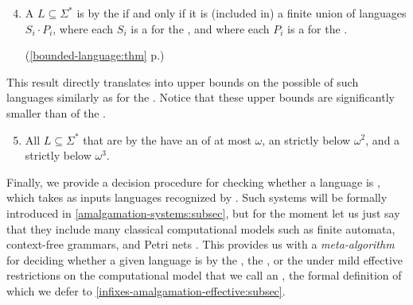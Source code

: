 {
\renewcommand{\labelenumi}{R\arabic{enumi}}
\begin{enumerate}
	\setcounter{enumi}{3}
    \item A  $L \subseteq \Sigma^*$ is  by the  if and only if it is (included in) a finite union of languages $S_i \cdot P_i$, where each $S_i$ 
        is a  for the ,
        and where
        each $P_i$ is a  for the .

        \hfill
        (\cref{bounded-language:thm} p.\pageref{bounded-language:thm})
\end{enumerate}
}

This result directly translates into upper bounds on the possible 
of such languages similarly as for the . Notice that these
upper bounds are significantly smaller than  of the .
{
\renewcommand{\labelenumi}{R\arabic{enumi}}
\begin{enumerate}
    \setcounter{enumi}{4}
    \item All 
            $L \subseteq \Sigma^*$ that are  by the 
            have an  of at most $\omega$,
            an  strictly below $\omega^2$, and
            a  strictly below $\omega^3$.
\end{enumerate}
}

\AP Finally, we provide a decision procedure for checking whether a language is
, which takes as inputs languages recognized by
 \cite{ASZZ24}. Such systems will be formally
introduced in
\cref{amalgamation-systems:subsec}, but
for the moment let us just say that they include many classical computational
models such as finite automata, context-free grammars, and Petri nets
\cite{ASZZ24}. This provides us with a \emph{meta-algorithm} for deciding
whether a given language is  by the , the , or the  under mild
effective restrictions on the computational model that we call an , the formal definition of which we defer to
\cref{infixes-amalgamation-effective:subsec}.

